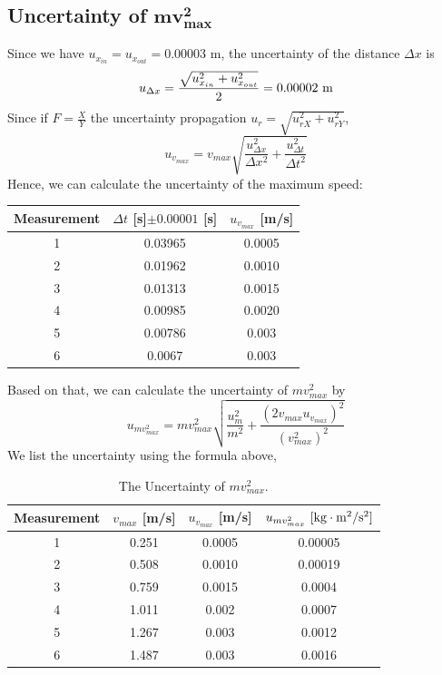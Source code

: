 \documentclass[a4paper]{report}
\begin{document}
	\subsection{Uncertainty of $\bm{mv_{max}^2}$}
	Since we have $u_{x_{in}}=u_{x_{out}}=0.00003$ m, the uncertainty of the distance $\Delta x$ is
	\begin{equation*}
	u_{\Delta x}=\dfrac{\sqrt{u_{x_{in}}^2+u_{x_{out}}^2}}{2}=0.00002\ \rm{m}
	\end{equation*}
	Since if $F=\frac{X}{Y}$ the uncertainty propagation $u_r=\sqrt{u_{rX}^2+u_{rY}^2}$,
	\begin{equation*}
	u_{v_{max}}=v_{max}\sqrt{\dfrac{u_{\Delta x}^2}{\Delta x^2}+\dfrac{u_{\Delta t}^2}{\Delta t^2}}
	\end{equation*}
	Hence, we can calculate the uncertainty of the maximum speed:
	\begin{table}[H]
		\centering
		\begin{tabular}{|c|c|c|}
			\hline
			Measurement&$\Delta t$ [s]$\pm0.00001$ [s]&$u_{v_{max}}$ [m/s]\\
			\hline
			1&0.03965&0.0005\\
			\hline
			2&0.01962&0.0010\\
			\hline
			3&0.01313&0.0015\\
			\hline
			4&0.00985&0.0020\\
			\hline
			5&0.00786&0.003\\
			\hline
			6&0.0067&0.003\\
			\hline
		\end{tabular}
	\end{table}
	Based on that, we can calculate the uncertainty of $mv_{max}^2$ by
	\begin{equation*}
	u_{mv_{max}^2}=mv_{max}^2\sqrt{\dfrac{u_m^2}{m^2}+\dfrac{(2v_{max}u_{v_{max}})^2}{(v_{max}^2)^2}}
	\end{equation*}
	We list the uncertainty using the formula above,
	\begin{table}[H]
		\centering
		\begin{tabular}{|c|c|c|c|}
			\hline
			Measurement&$v_{max}$ [m/s]&$u_{v_{max}}$ [m/s]&$u_{mv_{max}^2}\ [\rm{kg\cdot m^2/s^2}]$\\
			\hline
			1&0.251&0.0005&0.00005\\
			\hline
			2&0.508&0.0010&0.00019\\
			\hline
			3&0.759&0.0015&0.0004\\
			\hline
			4&1.011&0.002&0.0007\\
			\hline
			5&1.267&0.003&0.0012\\
			\hline
			6&1.487&0.003&0.0016\\
			\hline
		\end{tabular}
	\caption{The Uncertainty of $mv_{max}^2$.}
	\end{table}
\end{document}
